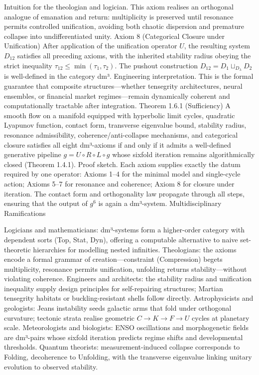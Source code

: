 Intuition for the theologian and logician. This axiom realises an orthogonal analogue of emanation and return: multiplicity is preserved until resonance permits controlled unification, avoiding both chaotic dispersion and premature collapse into undifferentiated unity.
Axiom 8 (Categorical Closure under Unification)
After application of the unification operator $  U  $, the resulting system $  D_{12}  $ satisfies all preceding axioms, with the inherited stability radius obeying the strict inequality $  \tau_{12} \le \min(\tau_1, \tau_2)  $. The pushout construction $  D_{12} = D_1 \sqcup_{D_\lambda} D_2  $ is well-defined in the category dm³.
Engineering interpretation. This is the formal guarantee that composite structures—whether tensegrity architectures, neural ensembles, or financial market regimes—remain dynamically coherent and computationally tractable after integration.
Theorem 1.6.1 (Sufficiency)
A smooth flow on a manifold equipped with hyperbolic limit cycles, quadratic Lyapunov function, contact form, transverse eigenvalue bound, stability radius, resonance admissibility, coherence/anti-collapse mechanisms, and categorical closure satisfies all eight dm³-axioms if and only if it admits a well-defined generative pipeline $  g = U \circ R \circ L \circ g  $ whose sixfold iteration remains algorithmically closed (Theorem 1.4.1).
Proof sketch. Each axiom supplies exactly the datum required by one operator: Axioms 1–4 for the minimal model and single-cycle action; Axioms 5–7 for resonance and coherence; Axiom 8 for closure under iteration. The contact form and orthogonality law propagate through all steps, ensuring that the output of $  g^6  $ is again a dm³-system.
Multidisciplinary Ramifications

Logicians and mathematicians: dm³-systems form a higher-order category with dependent sorts (Top, Stat, Dyn), offering a computable alternative to naive set-theoretic hierarchies for modelling nested infinities.
Theologians: the axioms encode a formal grammar of creation—constraint (Compression) begets multiplicity, resonance permits unification, unfolding returns stability—without violating coherence.
Engineers and architects: the stability radius and unification inequality supply design principles for self-repairing structures; Martian tensegrity habitats or buckling-resistant shells follow directly.
Astrophysicists and geologists: Jeans instability seeds galactic arms that fold under orthogonal curvature; tectonic strata realise geometric $  C \to K \to F \to U  $ cycles at planetary scale.
Meteorologists and biologists: ENSO oscillations and morphogenetic fields are dm³-pairs whose sixfold iteration predicts regime shifts and developmental thresholds.
Quantum theorists: measurement-induced collapse corresponds to Folding, decoherence to Unfolding, with the transverse eigenvalue linking unitary evolution to observed stability.

